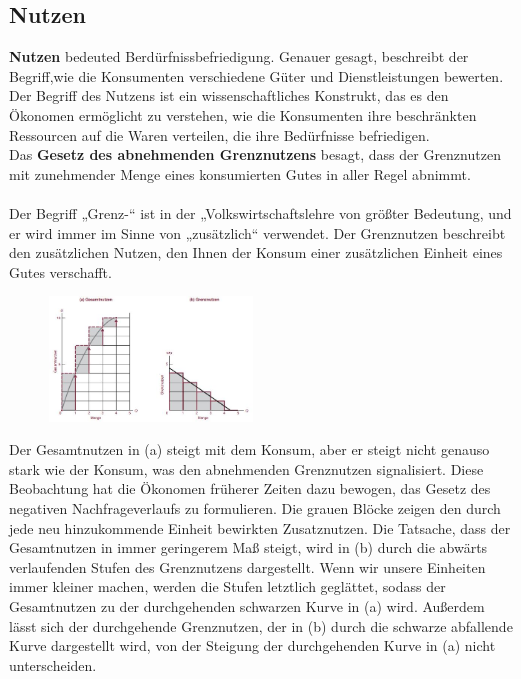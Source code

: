 \documentclass[10pt]{scrartcl}
\begin{document}
\subsection{Nutzen}
{\bf Nutzen} bedeuted Berdürfnissbefriedigung. Genauer gesagt, beschreibt der Begriff,wie die Konsumenten verschiedene Güter und Dienstleistungen bewerten. Der Begriff des Nutzens ist ein wissenschaftliches Konstrukt, das es den Ökonomen ermöglicht zu verstehen, wie die Konsumenten ihre beschränkten Ressourcen auf die Waren verteilen, die ihre Bedürfnisse befriedigen.\\
Das {\bf Gesetz des abnehmenden Grenznutzens} besagt, dass der Grenznutzen mit zunehmender Menge eines konsumierten Gutes in aller Regel abnimmt.\\ 
\\
Der Begriff „Grenz-“ ist in der „Volkswirtschaftslehre von größter Bedeutung, und er wird immer im Sinne von „zusätzlich“ verwendet. Der Grenznutzen beschreibt den zusätzlichen Nutzen, den Ihnen der Konsum einer zusätzlichen Einheit eines Gutes verschafft. \\
\begin{figure}
\vspace{-20pt}
  \begin{center}
    \includegraphics[width=0.48\textwidth]{img/nutzen.jpg}
  \end{center}
  \vspace{-10pt}
\end{figure}
Der Gesamtnutzen in (a) steigt mit dem Konsum, aber er steigt nicht genauso stark wie der Konsum, was den abnehmenden Grenznutzen signalisiert. Diese Beobachtung hat die Ökonomen früherer Zeiten dazu bewogen, das Gesetz des negativen Nachfrageverlaufs zu formulieren. Die grauen Blöcke zeigen den durch jede neu hinzukommende Einheit bewirkten Zusatznutzen. Die Tatsache, dass der Gesamtnutzen in immer geringerem Maß steigt, wird in (b) durch die abwärts verlaufenden Stufen des Grenznutzens dargestellt. Wenn wir unsere Einheiten immer kleiner machen, werden die Stufen letztlich geglättet, sodass der Gesamtnutzen zu der  durchgehenden schwarzen Kurve in (a) wird. Außerdem lässt sich der durchgehende Grenznutzen, der in (b) durch die schwarze abfallende Kurve dargestellt wird, von der Steigung der durchgehenden Kurve in (a) nicht unterscheiden. \\
\end{document}
